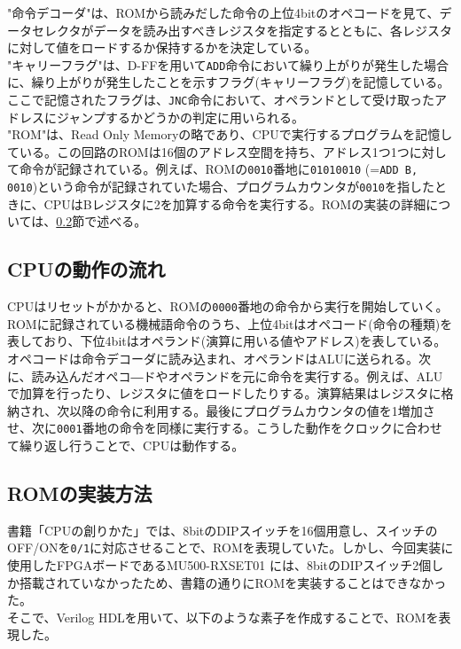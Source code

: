 \documentclass[dvipdfmx,a4j, titlepage]{jsarticle}
\begin{document}
"命令デコーダ"は、ROMから読みだした命令の上位4bitのオペコードを見て、データセレクタがデータを読み出すべきレジスタを指定するとともに、各レジスタに対して値をロードするか保持するかを決定している。\\

"キャリーフラグ"は、D-FFを用いて\verb|ADD|命令において繰り上がりが発生した場合に、繰り上がりが発生したことを示すフラグ(キャリーフラグ)を記憶している。ここで記憶されたフラグは、\verb|JNC|命令において、オペランドとして受け取ったアドレスにジャンプするかどうかの判定に用いられる。\\

"ROM"は、Read Only Memoryの略であり、CPUで実行するプログラムを記憶している。この回路のROMは16個のアドレス空間を持ち、アドレス1つ1つに対して命令が記録されている。例えば、ROMの\verb|0010|番地に\verb|01010010| (=\verb|ADD B, 0010|)という命令が記録されていた場合、プログラムカウンタが\verb|0010|を指したときに、CPUはBレジスタに2を加算する命令を実行する。ROMの実装の詳細については、\ref{implemtnt_rom}節で述べる。\\

\subsection{CPUの動作の流れ}
CPUはリセットがかかると、ROMの\verb|0000|番地の命令から実行を開始していく。ROMに記録されている機械語命令のうち、上位4bitはオペコード(命令の種類)を表しており、下位4bitはオペランド(演算に用いる値やアドレス)を表している。オペコードは命令デコーダに読み込まれ、オペランドはALUに送られる。次に、読み込んだオペコ―ドやオペランドを元に命令を実行する。例えば、ALUで加算を行ったり、レジスタに値をロードしたりする。演算結果はレジスタに格納され、次以降の命令に利用する。最後にプログラムカウンタの値を1増加させ、次に\verb|0001|番地の命令を同様に実行する。こうした動作をクロックに合わせて繰り返し行うことで、CPUは動作する。

\subsection{ROMの実装方法}\label{implemtnt_rom}
書籍「CPUの創りかた」では、8bitのDIPスイッチを16個用意し、スイッチのOFF/ONを\verb|0/1|に対応させることで、ROMを表現していた。しかし、今回実装に使用したFPGAボードであるMU500-RXSET01
には、8bitのDIPスイッチ2個しか搭載されていなかったため、書籍の通りにROMを実装することはできなかった。\\
そこで、Verilog HDLを用いて、以下のような素子を作成することで、ROMを表現した。\\
\end{document}
